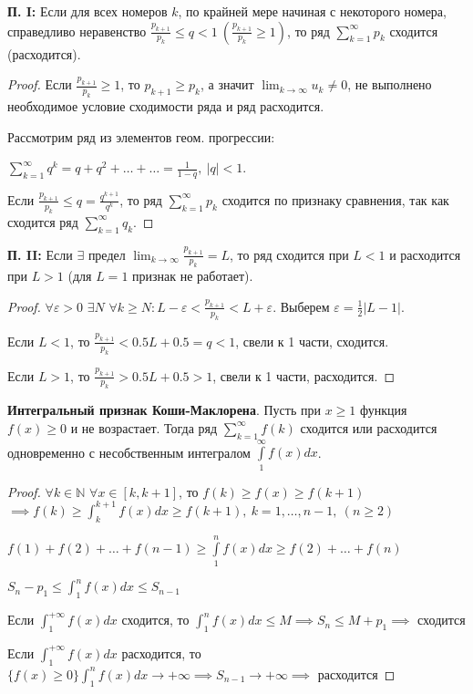 \textbf{П. I:} Если для всех номеров $k$, по крайней мере начиная с некоторого номера, справедливо неравенство
$\frac{p_{k+1}}{p_k} \leqslant q < 1 ~ \left( \frac{p_{k+1}}{p_k} \geqslant 1 \right)$,
то ряд $\displaystyle \sum_{k=1}^{\infty}p_k$ сходится (расходится).
    
\begin{proof}
Если $\frac{p_{k+1}}{p_k} \geqslant 1$, то $p_{k+1} \geqslant p_k$, а значит $\lim_{k\rightarrow\infty} u_k \neq 0$,
не выполнено необходимое условие сходимости ряда и ряд расходится.

Рассмотрим ряд из элементов геом. прогрессии: 

$\sum_{k=1}^{\infty} q^k = q + q^2 + \dots + \dots = \frac{1}{1-q}, \ |q| < 1$.

Если $\frac{p_{k+1}}{p_k} \leqslant q = \frac{q^{k+1}}{q^k}$, то ряд $\displaystyle \sum_{k=1}^{\infty}p_k$ сходится по признаку сравнения,
так как сходится ряд $\displaystyle \sum_{k=1}^{\infty}q_k$.
\end{proof}

\textbf{П. II:} Если $\exists$ предел $\displaystyle\lim_{k\rightarrow\infty}\frac{p_{k+1}}{p_k} = L$,
то ряд сходится при $L < 1$ и расходится при $L > 1$ (для $L=1$ признак не работает).


\begin{proof}
$\forall \varepsilon > 0$ $\exists N$ $\forall k \geq N : L - \varepsilon < \frac{p_{k+1}}{p_k} < L + \varepsilon$.
Выберем $\varepsilon = \frac{1}{2} |L-1|$.

Если $L < 1$, то $\frac{p_{k+1}}{p_k} < 0.5L + 0.5 = q < 1$, свели к 1 части, сходится.

Если $L > 1$, то $\frac{p_{k+1}}{p_k} > 0.5L + 0.5 > 1$, свели к 1 части, расходится.
\end{proof}

\bigbreak
\textbf{Интегральный признак Коши-Маклорена}.
Пусть при $x \geqslant 1$ функция $f(x) \geq 0$ и не возрастает.
Тогда ряд $\displaystyle \sum_{k=1}^{\infty}f(k)$ сходится или расходится одновременно с несобственным интегралом
$\int\limits_{1}^{\infty}f(x)dx$.

\begin{proof}
$\forall k \in \mathbb{N}$ $\forall x \in [k, k + 1]$, то $f(k) \geq f(x) \geq f(k+1) $
$\implies f(k) \geq \int_k^{k+1}f(x)dx \geq f(k+1), ~ k = 1, \dots, n-1, ~ (n \geq 2)$

$f(1) + f(2) + \dots + f(n-1) \geq \int\limits_1^n f(x)dx \geq f(2) + \dots + f(n)$

$S_n - p_1 \leq \int_1^n f(x)dx \leq S_{n-1}$

Если $\int_1^{+\infty} f(x)dx$ сходится, то $\int_1^n f(x)dx \leq M \implies S_n \leq M + p_1 \implies$ сходится 

Если $\int_1^{+\infty} f(x)dx$ расходится, то $\{f(x) \geq 0\} \int_1^n f(x)dx \rightarrow +\infty \implies S_{n-1} \rightarrow +\infty \implies$ расходится
\end{proof}

